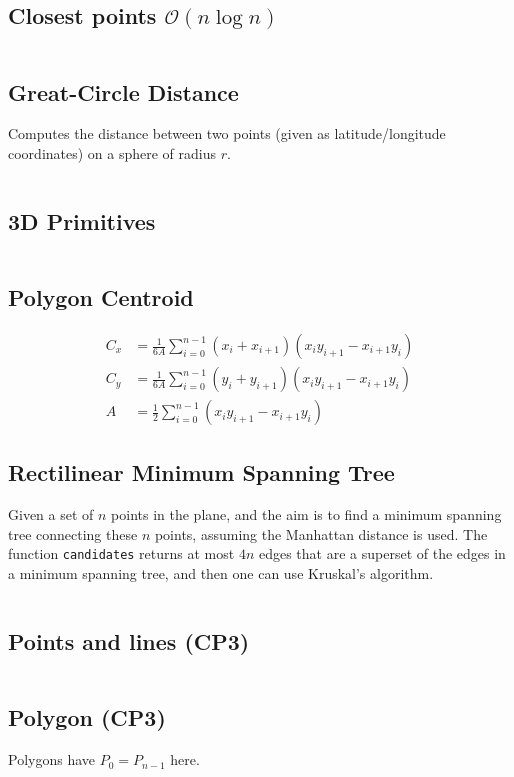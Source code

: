 \documentclass[9pt,a4paper,landscape,oneside]{amsart}
\newcommand{\mintedstyle}[2]{\inputminted{#1}{code/#2}}
\newcommand{\code}[1]{\mintedstyle{cpp}{#1}}
\begin{document}
\begin{multicols*}{3}
\subsection{Closest points $\mathcal{O}(n \log n)$}
\code{geometry/closest_points.cpp}

\subsection{Great-Circle Distance}
Computes the distance between two points (given as latitude/longitude
coordinates) on a sphere of radius $r$.
\code{geometry/gc_distance.cpp}

\subsection{3D Primitives}
\code{geometry/primitives3d.cpp}

\subsection{Polygon Centroid}
\begin{align*}
  C_x &= \frac{1}{6A}\sum_{i=0}^{n-1}(x_i+x_{i+1})(x_iy_{i+1} - x_{i+1}y_i) \\
  C_y &= \frac{1}{6A}\sum_{i=0}^{n-1}(y_i+y_{i+1})(x_iy_{i+1} - x_{i+1}y_i) \\
  A &= \frac12\sum_{i=0}^{n-1}(x_iy_{i+1}-x_{i+1}y_i)
\end{align*}

\subsection{Rectilinear Minimum Spanning Tree}
Given a set of $n$ points in the plane, and the aim is to find a
minimum spanning tree connecting these $n$ points, assuming the
Manhattan distance is used. The function \texttt{candidates} returns at
most $4n$ edges that are a superset of the edges in a minimum spanning
tree, and then one can use Kruskal's algorithm.
\code{geometry/rmst.cpp}

\subsection{Points and lines (CP3)}
\code{geometry/CP/points_lines.cpp}
\subsection{Polygon (CP3)}
Polygons have $P_0 = P_{n-1}$ here.
\code{geometry/CP/polygon.cpp}

\end{multicols*}
\end{document}
